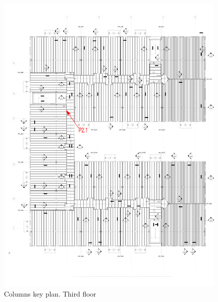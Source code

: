 \begin{figure}
  \begin{center}
  \includegraphics[width=120mm]{figures/columns_key_plan_3rd_floor}
  \end{center}
  \caption{Columns key plan. Third floor}\label{fg_columns_key_plan_3rd_floor}
\end{figure}

